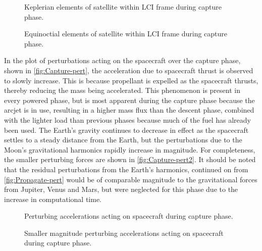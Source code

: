 \begin{figure}
\centering
\def\svgwidth{\figurewidth}

\caption{Keplerian elements of satellite within LCI frame during capture phase.} \label{fig:Capture-kep-lci}
\end{figure}

\begin{figure}
\centering
\def\svgwidth{\figurewidth}

\caption{Equinoctial elements of satellite within LCI frame during capture phase.} \label{fig:Capture-mee}
\end{figure}

In the plot of perturbations acting on the spacecraft over the capture phase, shown in \autoref{fig:Capture-pert}, the acceleration due to spacecraft thrust is observed to slowly increase. This is because propellant is expelled as the spacecraft thrusts, thereby reducing the mass being accelerated. This phenomenon is present in every powered phase, but is most apparent during the capture phase because the arcjet is in use, resulting in a higher mass flux than the descent phase, combined with the lighter load than previous phases because much of the fuel has already been used. The Earth's gravity continues to decrease in effect as the spacecraft settles to a steady distance from the Earth, but the perturbations due to the Moon's gravitational harmonics rapidly increase in magnitude. For completeness, the smaller perturbing forces are shown in \autoref{fig:Capture-pert2}. It should be noted that the residual perturbations from the Earth's harmonics, continued on from \autoref{fig:Propagate-pert} would be of comparable magnitude to the gravitational forces from Jupiter, Venus and Mars, but were neglected for this phase due to the increase in computational time.

\begin{subfigures}
\begin{figure}
\centering
\def\svgwidth{\figurewidth}

\caption{Perturbing accelerations acting on spacecraft during capture phase.} \label{fig:Capture-pert}
\end{figure}

\begin{figure}
\centering
\def\svgwidth{\figurewidth}

\caption{Smaller magnitude perturbing accelerations acting on spacecraft during capture phase.} \label{fig:Capture-pert2}
\end{figure}
\end{subfigures}

